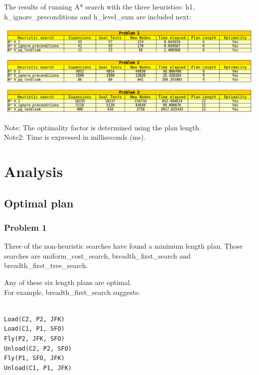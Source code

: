 \documentclass[10pt, a4paper,english]{article}
\begin{document}
The results of running A* search with the three heuristics: h1, h\_ignore\_preconditions and h\_level\_sum are included next:

 \begin{center}
\includegraphics[width=1\textwidth]{heuristic.png}\\
\end{center}

\begin{scriptsize}
Note: The optimality factor is determined using the plan length.\\
\indent Note2: Time is expressed in milliseconds (ms).
\end{scriptsize}

\section{Analysis}

\subsection{Optimal plan}

\subsubsection{Problem 1}

Three of the non-heuristic searches have found a minimum length plan. Those searches are uniform\_cost\_search, breadth\_first\_search and breadth\_first\_tree\_search.

Any of these six length plans are optimal. \\

For example, breadth\_first\_search suggests:

\indent \texttt{ \\
\indent Load(C2, P2, JFK) \\
\indent Load(C1, P1, SFO) \\
\indent Fly(P2, JFK, SFO) \\
\indent Unload(C2, P2, SFO) \\
\indent Fly(P1, SFO, JFK) \\
\indent Unload(C1, P1, JFK) \\
}
\end{document}
